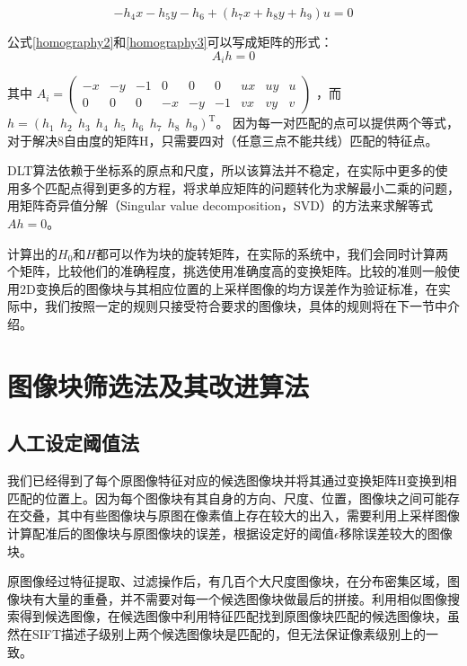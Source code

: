 \begin{equation}
\label{homography3}
-h_4x - h_5y - h_6 + (h_7x+h_8y+h_9)u = 0
\end{equation}

公式\eqref{homography2}和\eqref{homography3}可以写成矩阵的形式：
\begin{equation}
\label{homography4}
A_ih = 0
\end{equation}

其中
\(A_i = 
\begin{pmatrix}
-x & -y & -1 & 0 & 0 & 0 &ux & uy & u \\
0 & 0 & 0 & -x & -y & -1 &vx & vy & v 
\end{pmatrix}\)
，而
\(h = (h_1 \ \ h_2 \ \ h_3 \ \ h_4 \ \ h_5 \ \ h_6 \ \ h_7 \ \ h_8 \ \ h_9)^\mathrm{T}\)。
因为每一对匹配的点可以提供两个等式，对于解决8自由度的矩阵H，只需要四对（任意三点不能共线）匹配的特征点。

DLT算法依赖于坐标系的原点和尺度，所以该算法并不稳定，在实际中更多的使用多个匹配点得到更多的方程，将求单应矩阵的问题转化为求解最小二乘的问题，用矩阵奇异值分解（Singular value decomposition，SVD）的方法来求解等式\(Ah = 0\)。

计算出的\(H_0\)和\(H\)都可以作为块的旋转矩阵，在实际的系统中，我们会同时计算两个矩阵，比较他们的准确程度，挑选使用准确度高的变换矩阵。比较的准则一般使用2D变换后的图像块与其相应位置的上采样图像的均方误差作为验证标准，在实际中，我们按照一定的规则只接受符合要求的图像块，具体的规则将在下一节中介绍。

\section{图像块筛选法及其改进算法}
\subsection{人工设定阈值法}
我们已经得到了每个原图像特征对应的候选图像块并将其通过变换矩阵H变换到相匹配的位置上。因为每个图像块有其自身的方向、尺度、位置，图像块之间可能存在交叠，其中有些图像块与原图在像素值上存在较大的出入，需要利用上采样图像计算配准后的图像块与原图像块的误差，根据设定好的阈值\(\epsilon\)移除误差较大的图像块。

原图像经过特征提取、过滤操作后，有几百个大尺度图像块，在分布密集区域，图像块有大量的重叠，并不需要对每一个候选图像块做最后的拼接。利用相似图像搜索得到候选图像，在候选图像中利用特征匹配找到原图像块匹配的候选图像块，虽然在SIFT描述子级别上两个候选图像块是匹配的，但无法保证像素级别上的一致。

